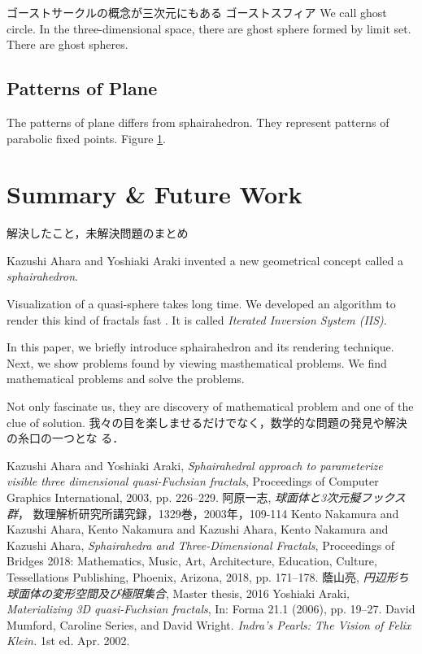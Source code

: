 \documentclass[dvipdfmx]{interact}
\theoremstyle{plain}%
\theoremstyle{definition}
\theoremstyle{remark}
\theoremstyle{problemstyle}
\begin{document}
ゴーストサークルの概念が三次元にもある
ゴーストスフィア
We call ghost circle. In the three-dimensional space, there are ghost
sphere formed by limit set.
There are ghost spheres.

\subsection{Patterns of Plane}
The patterns of plane differs from sphairahedron.
They represent patterns of parabolic fixed points.
Figure \ref{}.

\section{Summary \& Future Work}
解決したこと，未解決問題のまとめ

Kazushi Ahara and Yoshiaki Araki invented a new geometrical concept
called a \textit{sphairahedron}.

Visualization of a quasi-sphere takes long time.
We developed an algorithm to render this kind of fractals fast
\cite{bridges2018}.
 It is called \textit{Iterated Inversion System (IIS)}.

In this paper, we briefly introduce sphairahedron and its rendering
technique.
Next, we show problems found by viewing masthematical problems.
We find mathematical problems and solve the problems.

Not only fascinate us, they are discovery of mathematical problem
and one of the clue of solution.
我々の目を楽しませるだけでなく，数学的な問題の発見や解決の糸口の一つとな
る．

\begin{thebibliography}{99}
        Kazushi Ahara and Yoshiaki Araki,
        \emph{Sphairahedral approach to parameterize visible three
        dimensional quasi-Fuchsian fractals},
        Proceedings of Computer Graphics International, 2003,
        pp. 226--229.
        阿原一志, \emph{球面体と3次元擬フックス群}，
        数理解析研究所講究録，1329巻，2003年，109-114
        Kento Nakamura and Kazushi Ahara,
        Kento Nakamura and Kazushi Ahara,
        Kento Nakamura and Kazushi Ahara,
        \emph{Sphairahedra and Three-Dimensional Fractals}, 
        Proceedings of Bridges 2018: Mathematics, Music, Art, Architecture,
        Education, Culture, Tessellations Publishing,
        Phoenix, Arizona, 2018, pp. 171--178.
        蔭山亮, 
        \emph{円辺形ち球面体の変形空間及び極限集合},
        Master thesis, 2016
        Yoshiaki Araki,
        \emph{Materializing 3D quasi-Fuchsian fractals},
        In: Forma 21.1 (2006), pp. 19–27.
        David Mumford, Caroline Series, and David Wright.
        \emph{Indra’s Pearls: The Vision of Felix Klein.}
        1st ed. Apr. 2002.
\end{thebibliography}
\end{document}
